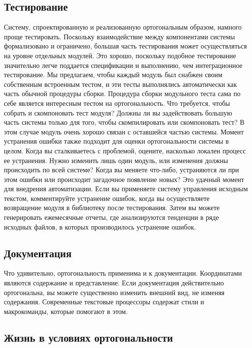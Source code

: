\subsection{Тестирование}

Систему, спроектированную и реализованную ортогональным образом, намного проще
тестировать. Поскольку взаимодействие между компонентами системы формализовано и
ограничено, большая часть тестирования может осуществляться на уровне отдельных
модулей. Это хорошо, поскольку подобное тестирование значительно легче поддается
спецификации и выполнению, чем интеграционное тестирование. Мы предлагаем, чтобы
каждый модуль был снабжен своим собственным встроенным тестом, и эти тесты
выполнялись автоматически как часть обычной процедуры сборки. Процедура сборки
модульного теста сама по себе является интересным тестом на ортогональность. Что
требуется, чтобы собрать и скомпоновать тест модуля? Должны ли вы задействовать
большую часть системы только для того, чтобы скомпилировать или скомпоновать
тест? В этом случае модуль очень хорошо связан с оставшейся частью системы.
Момент устранения ошибки также подходит для оценки ортогональности системы в
целом. Когда вы сталкиваетесь с проблемой, оцените, насколько локален процесс ее
устранения. Нужно изменить лишь один модуль, или изменения должны происходить по
всей системе? Когда вы меняете что-либо, устраняются ли при этом ошибки или
происходит загадочное появление новых? Это удачный момент для внедрения
автоматизации. Если вы применяете систему управления исходным текстом,
комментируйте устранение ошибок, когда вы осуществляете возвращение модуля в
библиотеку после тестирования. Затем вы можете генерировать ежемесячные отчеты,
где анализируются тенденции в ряде исходных файлов, в которых производилось
устранение ошибок.

\subsection{Документация}

Что удивительно, ортогональность применима и к документации. Координатами
являются содержание и представление. Если документация действительно
ортогональна, вы можете существенно изменить внешний вид, не изменяя содержания.
Современные текстовые процессоры содержат стили и макрокоманды, которые помогают
в этом.

\subsection{Жизнь в условиях ортогональности}

